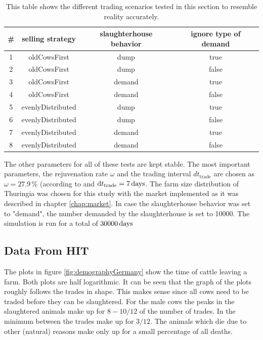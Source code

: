 \begin{table}[htb]
    \begin{center}
    \begin{tabular}{|cccc|}\hline
        \rowcolor{dunkelgrau} \#  & selling strategy & slaughterhouse behavior & ignore type of demand \\\hline
                              1  & oldCowsFirst& dump& true\\\hline
\rowcolor{hellgrau}           2  & oldCowsFirst& dump&  false\\\hline
                              3  & oldCowsFirst& demand& true\\\hline
\rowcolor{hellgrau}           4  & oldCowsFirst& demand& false\\\hline
                              5  & evenlyDistributed&dump& true\\\hline
\rowcolor{hellgrau}           6  & evenlyDistributed& dump& false\\\hline 
                              7 & evenlyDistributed& demand& true\\ \hline
\rowcolor{hellgrau}           8 & evenlyDistributed & demand&  false \\\hline           
\end{tabular}
\caption[Tested Trading Configurations]{This table shows the different trading scenarios tested in this section to resemble reality accurately.}
\label{tab:tradingConfig} 
\end{center}
\end{table}
The other parameters for all of these tests are kept stable. The most important parameters, the rejuvenation rate $\omega$ and the trading interval $dt_\text{trade}$ are chosen as $\omega =27.9\,\%$ (according to \citep{personalCom} and $\text{d}t_\text{trade} = 7\,\text{days}$. The farm size distribution of Thuringia was chosen for this study with the market implemented as it was described in chapter \ref{chap:market}. In case the slaughterhouse behavior was set to "demand", the number demanded by the slaughterhouse is set to 10000. The simulation is run for a total of $30000\,\text{days}$

\subsection{Data From HIT}
The plots in figure \ref{fig:demographyGermany} show the time of cattle leaving a farm. Both plots are half logarithmic. It can be seen that the graph of the plots roughly follows the trades in shape. This makes sense since all cows need to be traded before they can be slaughtered. For the male cows the peaks in the slaughtered animals make up for $8-10/12$ of the number of trades. In the minimum between the trades make up for $3/12$. The animals which die due to other (natural) reasons make only up for a small percentage of all deaths.



